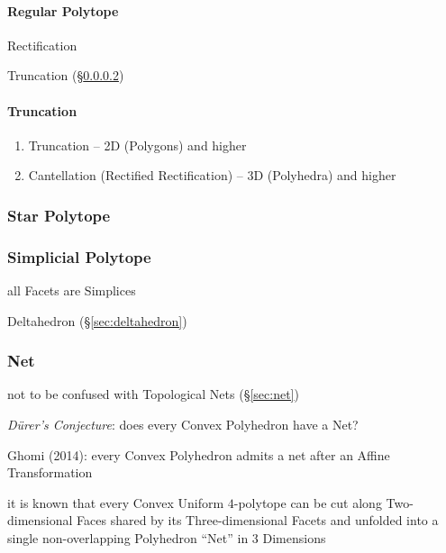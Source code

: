 \paragraph{Regular Polytope}\label{sec:regular_polytope}\hfill

Rectification

Truncation (\S\ref{sec:truncation_operator})



\paragraph{Truncation}\label{sec:truncation_operator}\hfill

\begin{enumerate}
  \item Truncation -- 2D (Polygons) and higher
  \item Cantellation (Rectified Rectification) -- 3D (Polyhedra) and higher
\end{enumerate}



\subsubsection{Star Polytope}\label{sec:star_polytope}

\subsubsection{Simplicial Polytope}\label{sec:simplicial_polytope}

all Facets are Simplices

Deltahedron (\S\ref{sec:deltahedron})



\subsubsection{Net}\label{sec:polytope_net}

\fist not to be confused with Topological Nets (\S\ref{sec:net})

\emph{D\"urer's Conjecture}: does every Convex Polyhedron have a Net?

Ghomi (2014): every Convex Polyhedron admits a net after an Affine
Transformation

it is known that every Convex Uniform $4$-polytope can be cut along
Two-dimensional Faces shared by its Three-dimensional Facets and unfolded into
a single non-overlapping Polyhedron ``Net'' in $3$ Dimensions





